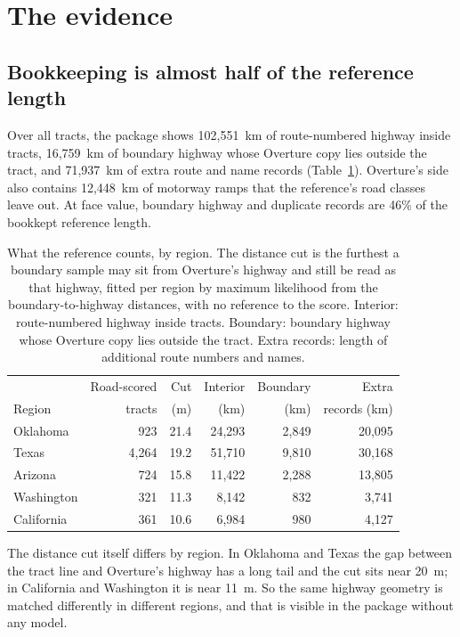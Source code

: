 \documentclass[10pt,twocolumn,a4paper]{article}
\begin{document}
\section{The evidence}
\label{sec:evidence}
\subsection{Bookkeeping is almost half of the reference length}
Over all tracts, the package shows 102,551~km of route-numbered highway inside tracts, 16,759~km of boundary highway whose
Overture copy lies outside the tract, and 71,937~km of extra route and name records (Table~\ref{tab:regions}). Overture's
side also contains 12,448~km of motorway ramps that the reference's road classes leave out. At face value, boundary
highway and duplicate records are 46\% of the bookkept reference length.

\begin{table}[t]
\centering\small
\caption{What the reference counts, by region. The distance cut is the furthest a boundary sample may sit from Overture's
highway and still be read as that highway, fitted per region by maximum likelihood from the boundary-to-highway
distances, with no reference to the score. Interior: route-numbered highway inside tracts. Boundary: boundary highway whose
Overture copy lies outside the tract. Extra records: length of additional route numbers and names.}
\label{tab:regions}
\setlength{\tabcolsep}{2pt}\footnotesize
\begin{tabular*}{\columnwidth}{@{\extracolsep{\fill}}lrrrrr@{}}
\toprule
 & Road-scored & Cut & Interior & Boundary & Extra\\
Region & tracts & (m) & (km) & (km) & records (km)\\
\midrule
Oklahoma   & 923   & 21.4 & 24,293 & 2,849 & 20,095\\
Texas      & 4,264 & 19.2 & 51,710 & 9,810 & 30,168\\
Arizona    & 724   & 15.8 & 11,422 & 2,288 & 13,805\\
Washington & 321   & 11.3 & 8,142  & 832   & 3,741\\
California & 361   & 10.6 & 6,984  & 980   & 4,127\\
\bottomrule
\end{tabular*}
\end{table}

The distance cut itself differs by region. In Oklahoma and Texas the gap between the tract line and Overture's highway has
a long tail and the cut sits near 20~m; in California and Washington it is near 11~m. So the same highway geometry is
matched differently in different regions, and that is visible in the package without any model.
\end{document}
